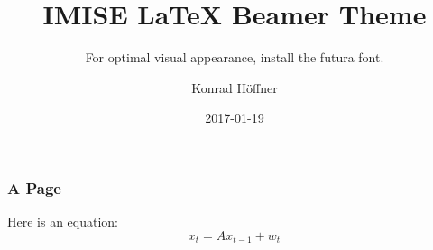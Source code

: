 \documentclass{beamer}
\author{Konrad Höffner}
\date{2017-01-19}
\title{IMISE \LaTeX{} Beamer Theme}
\subtitle{For optimal visual appearance, install the futura font.}
\begin{document}
\begin{frame}
\titlepage
\end{frame}

\begin{frame}[fragile]
\frametitle{A Page}
Here is an equation:
\begin{equation}
x_t = Ax_{t-1} + w_t
\end{equation}
\end{frame}
\end{document}
